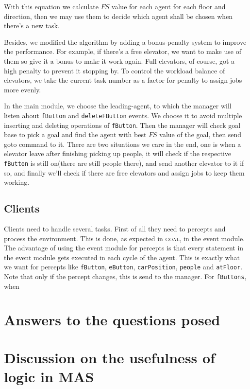 \documentclass[a4paper,10pt,twocolumn]{article}
\begin{document}
With this equation we calculate $FS$ value for each agent for each floor and direction, then we may use them to decide which agent shall be chosen when there's a new task.

Besides, we modified the algorithm by adding a bonus-penalty system to improve the performance. For example, if there's a free elevator, we want to make use of them so give it a bonus to make it work again. Full elevators, of course, got a high penalty to prevent it stopping by. To control the workload balance of elevators, we take the current task number as a factor for penalty to assign jobs more evenly.

In the main module, we choose the leading-agent, to which the manager will listen about \texttt{fButton} and \texttt{deleteFButton} events. We choose it to avoid multiple inserting and deleting operations of \texttt{fButton}. Then the manager will check goal base to pick a goal and find the agent with best $FS$ value of the goal, then send goto command to it. There are two situations we care in the end, one is when a elevator leave after finishing picking up people, it will check if the respective \texttt{fButton} is still on(there are still people there), and send another elevator to it if so, and finally we'll check if there are free elevators and assign jobs to keep them working.

\subsection{Clients}
Clients need to handle several tasks. First of all they need to percepts and process the environment. This is done, as expected in \textsc{goal}, in the event module. The advantage of using the event module for percepts is that every statement in the event module gets executed in each cycle of the agent. This is exactly what we want for percepts like \texttt{fButton}, \texttt{eButton}, \texttt{carPosition}, \texttt{people} and \texttt{atFloor}. Note that only if the percept changes, this is send to the manager. For \texttt{fButtons}, when 

\section{Answers to the questions posed}

\section{Discussion on the usefulness of logic in MAS}
\end{document}
